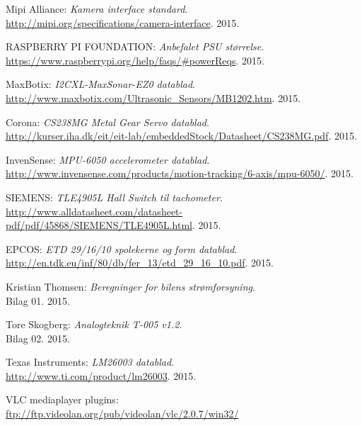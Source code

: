 \renewcommand{\bibname}{Litteraturliste}
\fancyhead[CE,CO]{}
\fancyfoot[CE,CO]{}
\begin{thebibliography}{2}


 Mipi Alliance: \textit{Kamera interface standard}. \\ 
\url{http://mipi.org/specifications/camera-interface}. 2015.

 RASPBERRY PI FOUNDATION: \textit{Anbefalet PSU størrelse}. \\
\url{https://www.raspberrypi.org/help/faqs/#powerReqs}. 2015.

 MaxBotix: \textit{I2CXL-MaxSonar-EZ0 datablad}. \\
\url{http://www.maxbotix.com/Ultrasonic_Sensors/MB1202.htm}. 2015.

 Corona: \textit{CS238MG Metal Gear Servo datablad}. \\
\url{http://kurser.iha.dk/eit/eit-lab/embeddedStock/Datasheet/CS238MG.pdf}. 2015.

 InvenSense: \textit{MPU-6050 accelerometer datablad}. \\
\url{http://www.invensense.com/products/motion-tracking/6-axis/mpu-6050/}. 2015.

 SIEMENS: \textit{TLE4905L Hall Switch til tachometer}. \\
\url{http://www.alldatasheet.com/datasheet-pdf/pdf/45868/SIEMENS/TLE4905L.html}. 2015.

 EPCOS: \textit{ETD 29/16/10 spolekerne og form datablad}. \\
\url{http://en.tdk.eu/inf/80/db/fer_13/etd_29_16_10.pdf}. 2015.

 Kristian Thomsen: \textit{Beregninger for bilens strømforsyning}. \\
Bilag 01. 2015.

 Tore Skogberg: \textit{Analogteknik T-005 v1.2}.\\
Bilag 02. 2015.

 Texas Instruments: \textit{LM26003 datablad}. \\
\url{http://www.ti.com/product/lm26003}. 2015.

 VLC mediaplayer plugins: \\
\url{ftp://ftp.videolan.org/pub/videolan/vlc/2.0.7/win32/}


\end{thebibliography}
